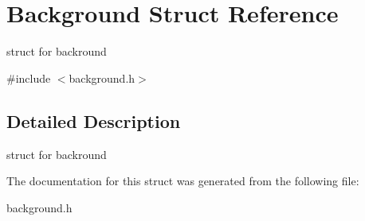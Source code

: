 \hypertarget{structBackground}{}\section{Background Struct Reference}
\label{structBackground}


struct for backround  




{\ttfamily \#include $<$background.\+h$>$}



\subsection{Detailed Description}
struct for backround 

The documentation for this struct was generated from the following file\+:\begin{DoxyCompactItemize}
\item 
background.\+h\end{DoxyCompactItemize}
